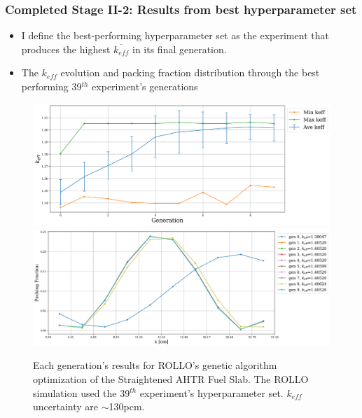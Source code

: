 \begin{frame}
    \frametitle{Completed Stage II-2: Results from best hyperparameter set}
    \begin{itemize}
        \item I define the best-performing hyperparameter set as the experiment that produces 
        the highest $\overline{k_{eff}}$ in its final generation. 
        \item The $k_{eff}$ evolution and packing fraction distribution through 
        the best performing 39$^{th}$ experiment's generations
    \end{itemize}
    \begin{figure}[]
        \centering
        \includegraphics[width=0.55\linewidth]{../docs/figures/keff_conv_39.png}
        \includegraphics[width=0.55\linewidth]{../docs/figures/pf_39.png}
        \caption{Each generation's results for ROLLO's genetic algorithm 
        optimization of the Straightened \acrfull{AHTR} Fuel Slab. The \gls{ROLLO} 
        simulation used the 39$^{th}$ experiment's hyperparameter set. $k_{eff}$ 
        uncertainty are $\sim$130pcm.}
    \end{figure}
\end{frame}

